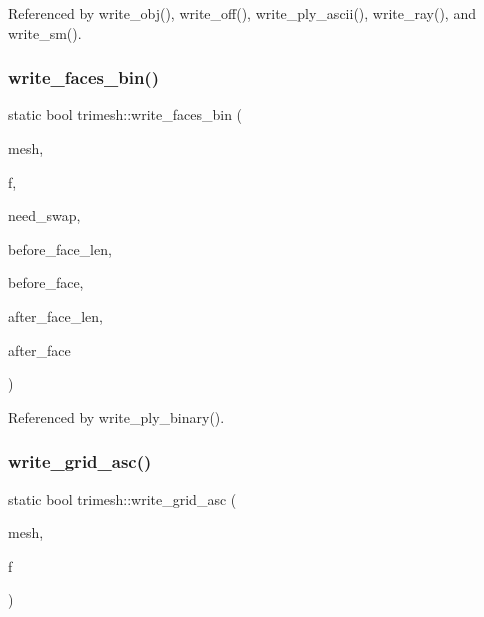 Referenced by write\+\_\+obj(), write\+\_\+off(), write\+\_\+ply\+\_\+ascii(), write\+\_\+ray(), and write\+\_\+sm().

\mbox{\label{namespacetrimesh_a0f0f9330c1eb34423e1c8801d656dbd9}} 
\subsubsection{\texorpdfstring{write\+\_\+faces\+\_\+bin()}{write\_faces\_bin()}}
{\footnotesize\ttfamily static bool trimesh\+::write\+\_\+faces\+\_\+bin (\begin{DoxyParamCaption}\item[{\hyperlink{classtrimesh_1_1TriMesh}{Tri\+Mesh} $\ast$}]{mesh,  }\item[{F\+I\+LE $\ast$}]{f,  }\item[{bool}]{need\+\_\+swap,  }\item[{int}]{before\+\_\+face\+\_\+len,  }\item[{const char $\ast$}]{before\+\_\+face,  }\item[{int}]{after\+\_\+face\+\_\+len,  }\item[{const char $\ast$}]{after\+\_\+face }\end{DoxyParamCaption})\hspace{0.3cm}{\ttfamily [static]}}



Referenced by write\+\_\+ply\+\_\+binary().

\mbox{\label{namespacetrimesh_a70bf1a4c22873759ab16a3dd15c4877d}} 
\subsubsection{\texorpdfstring{write\+\_\+grid\+\_\+asc()}{write\_grid\_asc()}}
{\footnotesize\ttfamily static bool trimesh\+::write\+\_\+grid\+\_\+asc (\begin{DoxyParamCaption}\item[{\hyperlink{classtrimesh_1_1TriMesh}{Tri\+Mesh} $\ast$}]{mesh,  }\item[{F\+I\+LE $\ast$}]{f }\end{DoxyParamCaption})\hspace{0.3cm}{\ttfamily [static]}}



